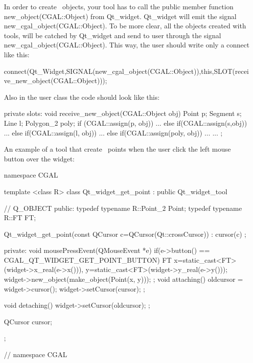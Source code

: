 In order to create \cgal\ objects, your tool has to call the public member 
function new\_object(CGAL::Object) from Qt\_widget. Qt\_widget will emit the 
signal new\_cgal\_object(CGAL::Object). To be more clear, all the objects 
created with tools, will be catched by Qt\_widget and send to user through the
 signal new\_cgal\_object(CGAL::Object). This way, the user should write only 
a connect like this:

connect(Qt\_Widget,SIGNAL(new\_cgal\_object(CGAL::Object)),this,SLOT(receive\_new\_object(CGAL::Object)));

Also in the user class the code should look like this:
\begin{ccExampleCode}
private slots:
void receive_new_object(CGAL::Object obj)
{
    Point p;
    Segment s;
    Line l;
    Polygon_2 poly;
    if (CGAL::assign(p, obj)) {
       ...
    } else if(CGAL::assign(s,obj)) {
       ...      
    } else if(CGAL::assign(l, obj)) {
       ...
    } else if(CGAL::assign(poly, obj)) {
       ...
    }
    ...
};
\end{ccExampleCode}

An example of a tool that create \cgal\ points when the user click the left mouse button over the widget:
\begin{ccExampleCode}
namespace CGAL {

template <class R>
class Qt_widget_get_point : public Qt_widget_tool
{
  //  Q_OBJECT
public:
  typedef typename R::Point_2	Point;
  typedef typename R::FT	FT;
  
  Qt_widget_get_point(const QCursor c=QCursor(Qt::crossCursor)) :
    cursor(c) {};
  
private:
  void mousePressEvent(QMouseEvent *e)
  {
    if(e->button() == CGAL_QT_WIDGET_GET_POINT_BUTTON)
    {
      FT
        x=static_cast<FT>(widget->x_real(e->x())),
        y=static_cast<FT>(widget->y_real(e->y()));
      widget->new_object(make_object(Point(x, y)));
    }
  };
  void attaching()
  {
    oldcursor = widget->cursor();
    widget->setCursor(cursor);
  };
  
  void detaching()
  {
    widget->setCursor(oldcursor);
  };

  QCursor cursor;
};

} // namespace CGAL
\end{ccExampleCode}








